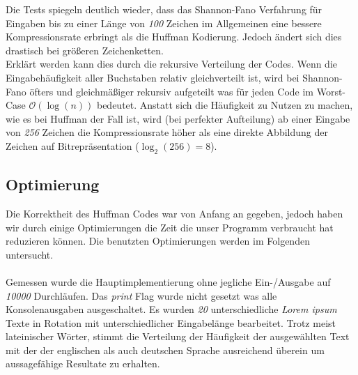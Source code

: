 \documentclass[course=erap]{aspdoc}
\begin{document}
Die Tests spiegeln deutlich wieder, dass das Shannon-Fano Verfahrung für Eingaben bis zu einer Länge von \textit{100} Zeichen im Allgemeinen eine bessere Kompressionsrate erbringt als die Huffman Kodierung. Jedoch ändert sich dies drastisch bei größeren Zeichenketten.\\
Erklärt werden kann dies durch die rekursive Verteilung der Codes. Wenn die Eingabehäufigkeit aller Buchstaben relativ gleichverteilt ist, wird bei Shannon-Fano öfters und gleichmäßiger rekursiv aufgeteilt was für jeden Code im Worst-Case $\mathcal{O}(\log(n))$ bedeutet. Anstatt sich die Häufigkeit zu Nutzen zu machen, wie es bei Huffman der Fall ist, wird (bei perfekter Aufteilung) ab einer Eingabe von \textit{256} Zeichen die Kompressionsrate höher als eine direkte Abbildung der Zeichen auf Bitrepräsentation ($\log_2(256)=8$). \cite{1819Vorlesung15a}
\subsection{Optimierung}
Die Korrektheit des Huffman Codes war von Anfang an gegeben, jedoch haben wir durch einige Optimierungen die Zeit die unser Programm verbraucht hat reduzieren können. Die benutzten Optimierungen werden im Folgenden untersucht.\\\\
Gemessen wurde die Hauptimplementierung ohne jegliche Ein-/Ausgabe auf \textit{10000} Durchläufen. Das \textit{print} Flag wurde nicht gesetzt was alle Konsolenausgaben ausgeschaltet. Es wurden \textit{20} unterschiedliche \textit{Lorem ipsum}\cite{lorem_ipsum-generator_und_informationen} Texte in Rotation mit unterschiedlicher Eingabelänge bearbeitet. Trotz meist lateinischer Wörter, stimmt die Verteilung der Häufigkeit der ausgewählten Text mit der der englischen als auch deutschen Sprache ausreichend überein um aussagefähige Resultate zu erhalten.
\end{document}
